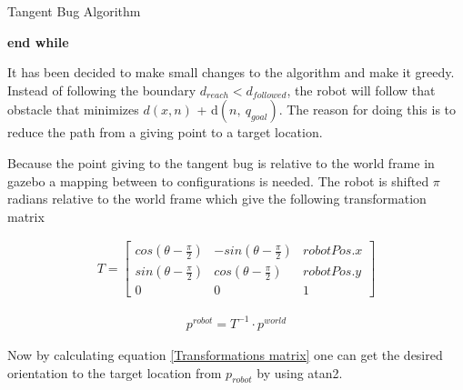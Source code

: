\documentclass[../Head/Main.tex]{subfiles}
\begin{document}
\begin{Pseudo}{Tangent Bug Algorithm}{}
\begin{Indentation}
\begin{Indentation}
\begin{Indentation}
\begin{Indentation}
\begin{itemize}
				\end{itemize}	
														
				\end{Indentation}			
			
			\end{Indentation}
		\item \textbf{end while}
		\end{Indentation}

	\end{Indentation}
	
\end{Pseudo}

It has been decided to make small changes to the algorithm and make it greedy. Instead of following the boundary $d_{reach} < d_{followed}$, the robot will follow that obstacle that minimizes ${d(x,n)}$ + d$\left(n,~q_{goal}\right)$. The reason for doing this is to reduce the path from a giving point to a target location.  

Because the point giving to the tangent bug is relative to the world frame in gazebo a mapping between to configurations is needed. The robot is shifted $\pi$ radians relative to the world frame which give the following transformation matrix 

\begin{align}
	T = \begin{bmatrix} 
	   cos(\theta-\frac{\pi}{2}) &  -sin(\theta-\frac{\pi}{2}) & robotPos.x \\ 
	    sin(\theta-\frac{\pi}{2}) &  cos(\theta-\frac{\pi}{2}) & robotPos.y \\
	    0 & 0 & 1					
	\end{bmatrix} 
\end{align}

\begin{align}
	p^{robot} = T^{-1} \cdot {p^{world}}
\end{align}
\label{Transformations matrix}

Now by calculating equation \ref{Transformations matrix} one can get the desired orientation to the target location from $p_{robot}$ by using atan2.
\end{document}
